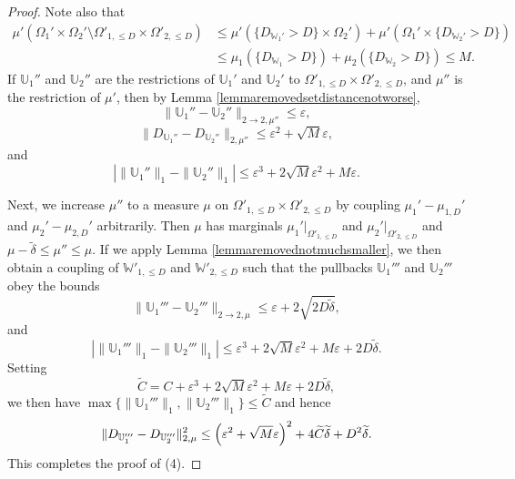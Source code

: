 \documentclass{amsart}
\numberwithin{equation}{section}
\numberwithin{figure}{section}
\theoremstyle{definition}
\theoremstyle{remark}
\newcommand{\cW}{\mathbb{W}}
\newcommand{\cU}{\mathbb{U}}
\begin{document}
\begin{proof}
Note also that
\begin{align*}
\mu'(\Omega_1'\times\Omega_2'\setminus\Omega'_{1,\leq D}\times \Omega'_{2,\leq D})
&\leq
\mu'(\{D_{\cW_1'}>D\}\times\Omega_2')+\mu'(\Omega_1'\times\{D_{\cW_2'}>D\})
\\
&\leq\mu_1(\{D_{\cW_1}>D\})+\mu_2(\{D_{\cW_2}>D\})
\leq M.
\end{align*}
If $\cU_1''$ and $\cU_2''$ are the restrictions of $\cU_1'$ and $\cU_2'$ to
$\Omega'_{1,\leq D}\times \Omega'_{2,\leq D}$, and $\mu''$ is the restriction
of $\mu'$, then by Lemma \ref{lemmaremovedsetdistancenotworse},
\[
\|\cU_1''-\cU_2''\|_{2 \rightarrow 2,\mu''} \le \varepsilon,
\]
\[
\|D_{\cU_1''}-D_{\cU_2''}\|_{2,\mu''} \le \varepsilon^2 + \sqrt{M}\varepsilon,
\]
and
\[
|\|\cU_1''\|_1 - \|\cU_2''\|_1| \le \varepsilon^3 +2\sqrt{M} \varepsilon^2 + M\varepsilon.
\]

Next, we increase $\mu''$ to a measure $\mu$ on $\Omega'_{1,\leq D}\times
\Omega'_{2,\leq D}$ by coupling $\mu_1' - \mu_{1,D}'$ and $\mu_2'-\mu_{2,D}'$
arbitrarily. Then $\mu$ has marginals $\mu_1'|_{\Omega'_{1,\leq D}}$ and
$\mu_2'|_{\Omega'_{2,\leq D}}$ and $\mu-\widetilde\delta\leq \mu''\leq \mu$.
If we apply Lemma \ref{lemmaremovednotmuchsmaller}, we then obtain a coupling
of $\cW'_{1,\le D}$ and $\cW'_{2,\le D}$ such that the pullbacks $\cU_1'''$
and $\cU_2'''$ obey the bounds
\[
\|\cU_1'''-\cU_2'''\|_{2 \rightarrow 2,\mu} \le \varepsilon + 2\sqrt{ 2 D\widetilde\delta},
\]
and
\[
|\|\cU_1'''\|_1 - \|\cU_2'''\|_1| \le \varepsilon^3 +2\sqrt{M} \varepsilon^2 + M\varepsilon + 2 D\widetilde\delta.
\]
Setting
\[
\widetilde C=C+\varepsilon^3 +2\sqrt{M} \varepsilon^2 + M\varepsilon + 2D\widetilde\delta,
\]
we then have $\max\{\|\cU_1'''\|_1 ,\|\cU_2'''\|_1\}\leq\widetilde C$ and hence
\[
\|D_{\cU_1'''}-D_{\cU_2'''}\|_{2,\mu}^2 \le \Bigl(\varepsilon^2 +
\sqrt{M}\varepsilon\Bigr)^{2} + 4 \widetilde C\widetilde\delta +
D^2\widetilde\delta.\] This completes the proof of (4).
\end{proof}
\end{document}
